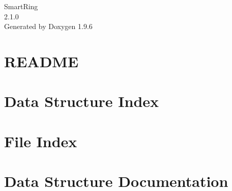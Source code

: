 \documentclass[twoside]{book}
\newcommand{\+}{\discretionary{\mbox{\scriptsize$\hookleftarrow$}}{}{}}
\newcommand{\clearemptydoublepage}{%
    \newpage{\pagestyle{empty}\cleardoublepage}%
  }
\begin{document}
  \raggedbottom
    \hypersetup{pageanchor=false,
                bookmarksnumbered=true,
                pdfencoding=unicode
               }
  \begin{titlepage}
  \vspace*{7cm}
  \begin{center}%
  {\Large Smart\+Ring}\\
  [1ex]\large 2.\+1.\+0 \\
  \vspace*{1cm}
  {\large Generated by Doxygen 1.9.6}\\
  \end{center}
  \end{titlepage}
  \clearemptydoublepage
  \tableofcontents
  \clearemptydoublepage
  \hypersetup{pageanchor=true}
\chapter{README}
\label{md_README}

\chapter{Data Structure Index}

\chapter{File Index}

\chapter{Data Structure Documentation}



















\end{document}

